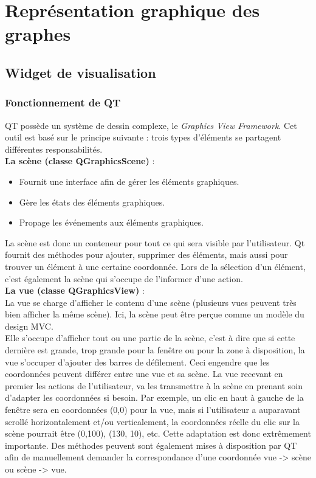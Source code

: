 \documentclass[french]{article}
\begin{document}
	\section{Représentation graphique des graphes}
		\subsection{Widget de visualisation}
			\subsubsection{Fonctionnement de QT}
				QT possède un système de dessin complexe, le \textit{Graphics View Framework}. Cet outil est basé sur le principe suivante : trois types d'éléments se partagent différentes responsabilités. \\
				
				\textbf{La scène (classe QGraphicsScene)} :
				\begin{itemize}
					\item Fournit une interface afin de gérer les éléments graphiques.
					\item Gère les états des éléments graphiques.
					\item Propage les événements aux éléments graphiques.
				\end{itemize}
				
				La scène est donc un conteneur pour tout ce qui sera visible par l'utilisateur. Qt fournit des méthodes pour ajouter, supprimer des éléments, mais aussi pour trouver un élément à une certaine coordonnée. Lors de la sélection d'un élément, c'est également la scène qui s'occupe de l'informer d'une action. \\
				
				\textbf{La vue (classe QGraphicsView)} : \\
				La vue se charge d'afficher le contenu d'une scène (plusieurs vues peuvent très bien afficher la même scène). Ici, la scène peut être perçue comme un modèle du design MVC. \\
				Elle s'occupe d'afficher tout ou une partie de la scène, c'est à dire que si cette dernière est grande, trop grande pour la fenêtre ou pour la zone à disposition, la vue s'occuper d'ajouter des barres de défilement. Ceci engendre que les coordonnées peuvent différer entre une vue et sa scène. La vue recevant en premier les actions de l'utilisateur, va les transmettre à la scène en prenant soin d'adapter les coordonnées si besoin. Par exemple, un clic en haut à gauche de la fenêtre sera en coordonnées (0,0) pour la vue, mais si l'utilisateur a auparavant scrollé horizontalement et/ou verticalement, la coordonnées réelle du clic sur la scène pourrait être (0,100), (130, 10), etc. Cette adaptation est donc extrêmement importante. Des méthodes peuvent sont également mises à disposition par QT afin de manuellement demander la correspondance d'une coordonnée vue -> scène ou scène -> vue. \\
				
\end{document}
